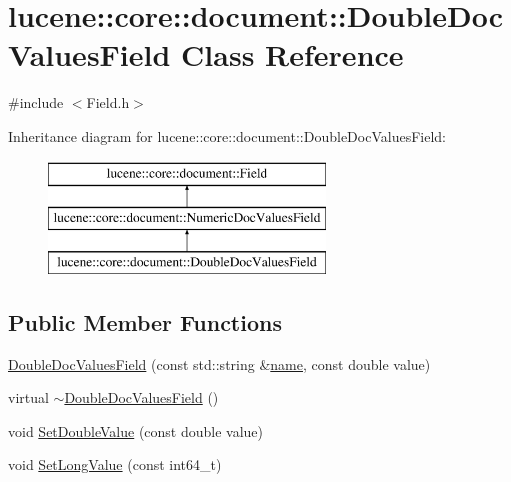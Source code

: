 \hypertarget{classlucene_1_1core_1_1document_1_1DoubleDocValuesField}{}\section{lucene\+:\+:core\+:\+:document\+:\+:Double\+Doc\+Values\+Field Class Reference}
\label{classlucene_1_1core_1_1document_1_1DoubleDocValuesField}


{\ttfamily \#include $<$Field.\+h$>$}

Inheritance diagram for lucene\+:\+:core\+:\+:document\+:\+:Double\+Doc\+Values\+Field\+:\begin{figure}[H]
\begin{center}
\leavevmode
\includegraphics[height=3.000000cm]{classlucene_1_1core_1_1document_1_1DoubleDocValuesField}
\end{center}
\end{figure}
\subsection*{Public Member Functions}
\begin{DoxyCompactItemize}
\item 
\mbox{\hyperlink{classlucene_1_1core_1_1document_1_1DoubleDocValuesField_a8b2140f651ea5578821571a6d8e22df6}{Double\+Doc\+Values\+Field}} (const std\+::string \&\mbox{\hyperlink{classlucene_1_1core_1_1document_1_1Field_a52f673f3b3abb14b180f5159f4726537}{name}}, const double value)
\item 
virtual \mbox{\hyperlink{classlucene_1_1core_1_1document_1_1DoubleDocValuesField_a365cb3b8018a3d6329b96a5d52509455}{$\sim$\+Double\+Doc\+Values\+Field}} ()
\item 
void \mbox{\hyperlink{classlucene_1_1core_1_1document_1_1DoubleDocValuesField_a1fe376e9158ee03034fd48fe259926ea}{Set\+Double\+Value}} (const double value)
\item 
void \mbox{\hyperlink{classlucene_1_1core_1_1document_1_1DoubleDocValuesField_ab51b275ef2d23c248e945f4747a6dd6e}{Set\+Long\+Value}} (const int64\+\_\+t)
\end{DoxyCompactItemize}
